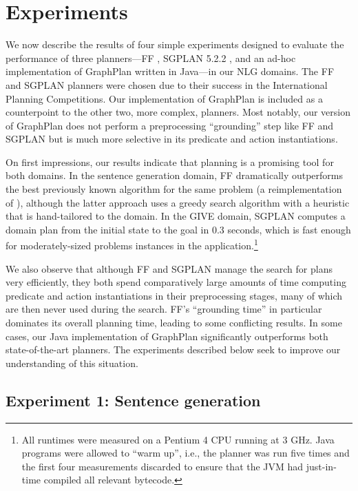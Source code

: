 

\section{Experiments}
\label{sec:experiments}

We now describe the results of four simple experiments designed to evaluate
the performance of three planners---FF \citep{HoffmannNebel01}, SGPLAN
5.2.2 \citep{hsu06:_new_featur_in_sgplan_for}, and an ad-hoc implementation
of GraphPlan \citep{Blum1997} written in Java---in our NLG domains. The FF
and SGPLAN planners were chosen due to their success in the International
Planning Competitions. Our implementation of GraphPlan is included as a
counterpoint to the other two, more complex, planners. Most notably, our
version of GraphPlan does not perform a preprocessing ``grounding'' step
like FF and SGPLAN but is much more selective in its predicate and action
instantiations.

On first impressions, our results indicate that planning is a promising
tool for both domains.  In the sentence generation domain, FF dramatically
outperforms the best previously known algorithm for the same problem (a
reimplementation of \citep{Stone2003a}), although the latter approach uses
a greedy search algorithm with a heuristic that is hand-tailored to the
domain. In the GIVE domain, SGPLAN computes a domain plan from the initial
state to the goal in 0.3 seconds, which is fast enough for moderately-sized
problems instances in the application.\footnote{All
  runtimes were measured on a Pentium 4 CPU running at 3 GHz. Java programs
  were allowed to ``warm up'', i.e., the planner was run five times and the
  first four measurements discarded to ensure that the JVM had just-in-time
  compiled all relevant bytecode.}

We also observe that although FF and SGPLAN manage the search for plans
very efficiently, they both spend comparatively large amounts of time
computing predicate and action instantiations in their preprocessing
stages, many of which are then never used during the search. FF's
``grounding time'' in particular dominates its overall planning time,
leading to some conflicting results. In some cases, our Java implementation
of GraphPlan significantly outperforms both state-of-the-art planners. The
experiments described below seek to improve our understanding of this
situation.


\subsection{Experiment 1: Sentence generation}
\label{sec:exper-1:-sent}

